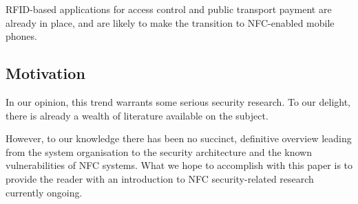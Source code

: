 

RFID-based applications for access control and public transport payment are already in place, and are likely to make the transition to NFC-enabled mobile phones.

\subsection{Motivation}
In our opinion, this trend warrants some serious security research. To our delight, there is already a wealth of literature available on the subject.

However, to our knowledge there has been no succinct, definitive overview leading from the system organisation to the security architecture and the known vulnerabilities of NFC systems.
What we hope to accomplish with this paper is to provide the reader with an introduction to NFC security-related research currently ongoing.

